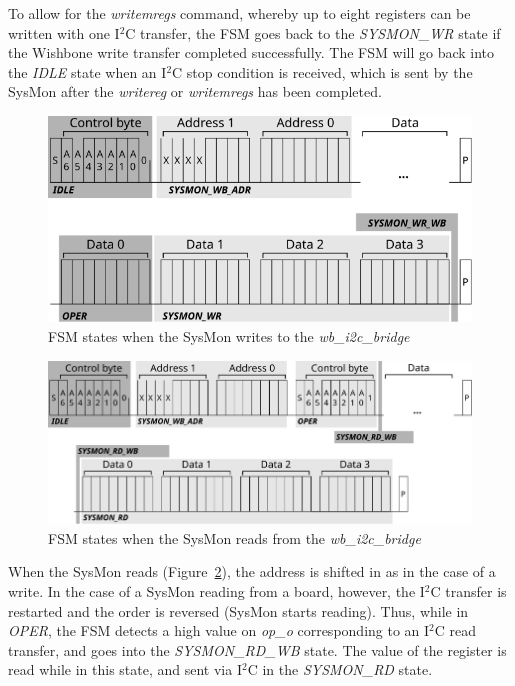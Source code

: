 \documentclass[a4paper,11pt]{article}
\begin{document}
To allow for the \textit{writemregs} command, whereby up to eight registers can be
written with one I$^2$C transfer, the FSM goes back to the \textit{SYSMON\_WR} state
if the Wishbone write transfer completed successfully. The FSM will go back into the
\textit{IDLE} state when an I$^2$C stop condition is received, which is sent by
the SysMon after the \textit{writereg} or \textit{writemregs} has been completed.

\begin{figure}[h]
  \centerline{\includegraphics[width=.8\textwidth]{fig/sysmon-wr-fsm}}
  \caption{FSM states when the SysMon writes to the \textit{wb\_i2c\_bridge}}
  \label{fig:sysmon-wr-fsm}
\end{figure}

\begin{figure}[h]
  \centerline{\includegraphics[width=\textwidth]{fig/sysmon-rd-fsm}}
  \caption{FSM states when the SysMon reads from the \textit{wb\_i2c\_bridge}}
  \label{fig:sysmon-rd-fsm}
\end{figure}

When the SysMon reads (Figure~\ref{fig:sysmon-rd-fsm}), the address is shifted in
as in the case of a write. In the case of a SysMon reading from a board,
however, the I$^2$C transfer is restarted and the order is reversed (SysMon starts
reading). Thus, while in \textit{OPER}, the FSM detects a high value on \textit{op\_o}
corresponding to an I$^2$C read transfer, and goes into the \textit{SYSMON\_RD\_WB}
state. The value of the register is read while in this state, and sent via I$^2$C
in the \textit{SYSMON\_RD} state.
\end{document}
